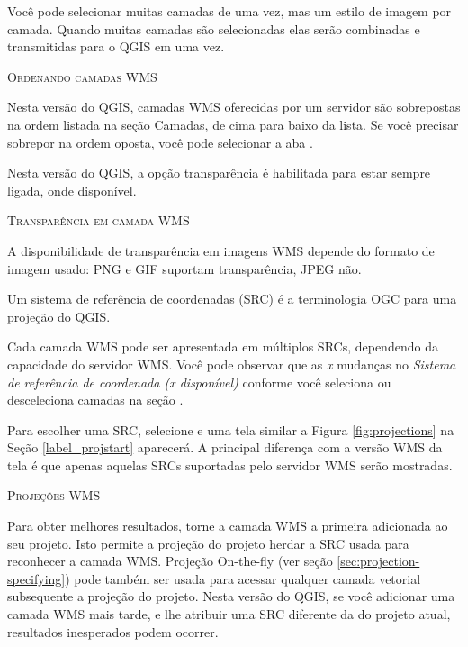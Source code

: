 Você pode selecionar muitas camadas de uma vez, mas um estilo de imagem por camada. Quando muitas camadas são selecionadas elas serão combinadas e transmitidas para o QGIS em uma vez.

\begin{Tip}[ht]\caption{\textsc{Ordenando camadas WMS}}
Nesta versão do QGIS, camadas WMS oferecidas por um servidor são sobrepostas na ordem listada na seção Camadas, de cima para baixo da lista.
Se você precisar sobrepor na ordem oposta, você pode selecionar a aba .
\end{Tip}

\label{ogc-wms-transparency}

Nesta versão do QGIS, a opção transparência é habilitada para estar sempre ligada, onde disponível.

\begin{Tip}[ht]\caption{\textsc{Transparência em camada WMS}}
A disponibilidade de transparência em imagens WMS depende do formato de imagem usado: PNG e GIF suportam transparência, JPEG não.
\end{Tip}


Um sistema de referência de coordenadas (SRC) é a terminologia OGC para uma projeção do QGIS.

Cada camada WMS pode ser apresentada em múltiplos SRCs, dependendo da capacidade do servidor WMS. Você pode observar que as \textsl{x} mudanças no \textsl{Sistema de referência de coordenada (x disponível)} conforme você seleciona ou desceleciona camadas na seção .

Para escolher uma SRC, selecione  e uma tela similar a Figura \ref{fig:projections} na Seção \ref{label_projstart} aparecerá.
A principal diferença com a versão WMS da tela é que apenas aquelas SRCs suportadas pelo servidor WMS serão mostradas.

\begin{Tip}[ht]\caption{\textsc{Projeções WMS}}
Para obter melhores resultados, torne a camada WMS a primeira adicionada ao seu projeto. Isto permite a projeção do projeto herdar a SRC usada para reconhecer a camada WMS. Projeção On-the-fly (ver seção  \ref{sec:projection-specifying}) pode também ser usada para acessar qualquer camada vetorial subsequente a projeção do projeto. Nesta versão do QGIS, se você adicionar uma camada WMS mais tarde, e lhe atribuir uma SRC diferente da do projeto atual, resultados inesperados podem ocorrer.
\end{Tip}

